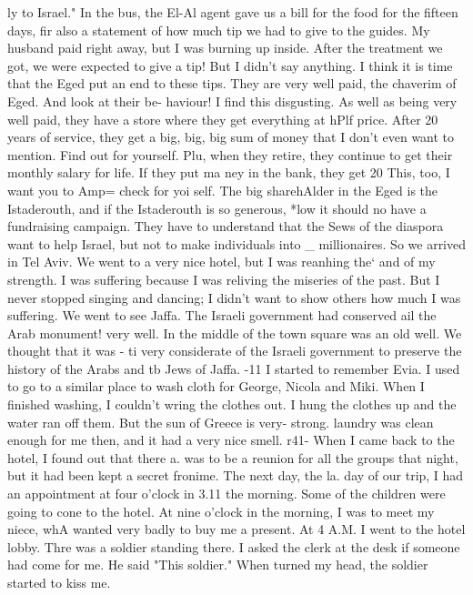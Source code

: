 ly to Israel."
In the bus, the El-Al agent gave us a bill for the food for the fifteen days, fir 
also a statement of how much tip we had to give to the guides.
My husband paid right 
away, but I was burning up inside.
After the treatment we got, we were expected to 
give a tip!
But I didn't say anything.
I think it is time that the Eged put an end 
to these tips.
They are very well paid, the chaverim of Eged.
And look at their be-
haviour!
I find this disgusting.
As well as being very well paid, they have a store 
where they get everything at hPlf price.
After 20 years of service, they get a big, 
big, big sum of money that I don't even want to mention.
Find out for yourself.
Plu, 
when they retire, they continue to get their monthly salary for life.
If they put ma 
ney in the bank, they get 20%
This, too, I want you to Amp= check for yoi 
self.
The big sharehAlder in the Eged is the Istaderouth, and if the Istaderouth is 
so generous, *low it should no have a fundraising campaign.
They have to understand 
that the Sews of the diaspora want to help Israel, but not to make individuals into _ 
millionaires.
So we arrived in Tel Aviv.
We went to a very nice hotel, but I was reanhing the` 
and of my strength.
I was suffering because I was reliving the miseries of the past.
But I never stopped singing and dancing; I didn't want to show others how much I was 
suffering.
We went to see Jaffa.
The Israeli government had conserved ail the Arab monument!
very well.
In the middle of the town square was an old well.
We thought that it was - 
ti 
very considerate of the Israeli government to preserve the history of the Arabs and tb 
Jews of Jaffa.
-11 
I started to remember Evia.
I used to go to a similar place to wash cloth 
for George, Nicola and Miki.
When I finished washing, I couldn't wring the clothes 
out.
I hung the clothes up and the water ran off them.
But the sun of Greece is very-
strong.
laundry was clean enough for me then, and it had a very nice smell.
r41- 
When I came back to the hotel, I found out that there a. was to be a reunion for 
all the groups that night, but it had been kept a secret fronime.
The next day, the la.
day of our trip, I had an appointment at four o'clock in 3.11 the morning.
Some of the 
children were going to cone to the hotel.
At nine o'clock in the morning, I was to 
meet my niece, whA wanted very badly to buy me a present.
At 4 A.M.
I went to the hotel lobby.
Thre was a soldier standing there.
I asked 
the clerk at the desk if someone had come for me.
He said "This soldier."
When 
turned my head, the soldier started to kiss me.
